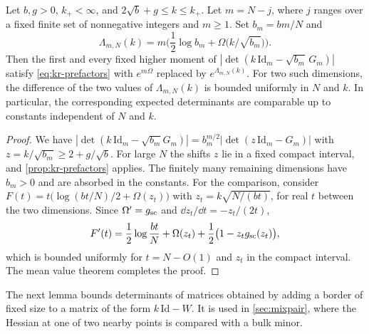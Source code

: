 \begin{corollary}\label{cor:kr-dimension}
Let $b,g>0$, $k_+<\infty$, and $2\sqrt b+g\le k\le k_+$. Let $m=N-j$, where $j$ ranges over a fixed finite set of nonnegative integers and $m\ge1$. Set $b_m=bm/N$ and
\[
\Lambda_{m,N}(k)=m\Big(\frac12\log b_m+\Omega\big(k/\sqrt{b_m}\big)\Big).
\]
Then the first and every fixed higher moment of $|\det(k\,\mathrm{Id}_m-\sqrt{b_m}\,G_m)|$ satisfy \eqref{eq:kr-prefactors} with $e^{m\Omega}$ replaced by $e^{\Lambda_{m,N}(k)}$. For two such dimensions, the difference of the two values of $\Lambda_{m,N}(k)$ is bounded uniformly in $N$ and $k$. In particular, the corresponding expected determinants are comparable up to constants independent of $N$ and $k$.
\end{corollary}

\begin{proof}
We have $|\det(k\,\mathrm{Id}_m-\sqrt{b_m}G_m)|=b_m^{m/2}|\det(z\,\mathrm{Id}_m-G_m)|$ with $z=k/\sqrt{b_m}\ge2+g/\sqrt b$. For large $N$ the shifts $z$ lie in a fixed compact interval, and \cref{prop:kr-prefactors} applies. The finitely many remaining dimensions have $b_m>0$ and are absorbed in the constants. For the comparison, consider $F(t)=t\big(\log(bt/N)/2+\Omega(z_t)\big)$ with $z_t=k\sqrt{N/(bt)}$, for real $t$ between the two dimensions. Since $\Omega'=g_{\rm sc}$ and $\dd z_t/\dd t=-z_t/(2t)$,
\[
F'(t)=\frac12\log\frac{bt}N+\Omega(z_t)+\frac12\big(1-z_tg_{\rm sc}(z_t)\big),
\]
which is bounded uniformly for $t=N-O(1)$ and $z_t$ in the compact interval. The mean value theorem completes the proof.
\end{proof}

The next lemma bounds determinants of matrices obtained by adding a border of fixed size to a matrix of the form $k\,\mathrm{Id}-W$. It is used in \cref{sec:mixpair}, where the Hessian at one of two nearby points is compared with a bulk minor.

